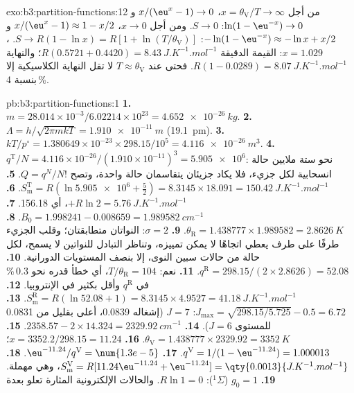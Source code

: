 \begin{solution}{exo:b3:partition-functions:12}
من أجل $x = \theta_{\mathrm V}/T \to \infty$، $x/(\eu^x - 1) \to 0$ و$\ln(1 - \eu^{-x}) \to 0$: $S \to 0$. ومن أجل $x \to 0$،
$x/(\eu^x - 1) \approx 1 - x/2$ و$-\ln(1 - \eu^{-x}) \approx -\ln x + x/2$: $S \to R(1 - \ln x) = R[1 + \ln(T/\theta_{\mathrm V})]$.
، $x = 1.029$: القيمة الدقيقة $R(0.5721 + 0.4420) = \qty{8.43}{J.K^{-1}.mol^{-1}}$؛ والنهاية $R(1 - 0.0289) =
\qty{8.07}{J.K^{-1}.mol^{-1}}$. فحتى عند $T \approx \theta_{\mathrm V}$ لا تقل النهاية الكلاسيكية إلا بنسبة 4\,\%.
\end{solution}

\begin{solution}{pb:b3:partition-functions:1}
\textbf{1.} $m = 28.014\times10^{-3}/6.02214\times10^{23} = \qty{4.652e-26}{kg}$.
\textbf{2.} $\Lambda = h/\sqrt{2\pi mkT} = \qty{1.910e-11}{m}$ (\qty{19.1}{pm}).
\textbf{3.} $kT/p^\circ = 1.380649\times10^{-23} \times 298.15/10^5 = \qty{4.116e-26}{m^3}$.
\textbf{4.} $q^{\mathrm T}/N = 4.116\times10^{-26}/(1.910\times10^{-11})^3 = \num{5.905e6}$: نحو ستة ملايين
حالة انسحابية لكل جزيء، فلا يكاد جزيئان يتقاسمان حالة واحدة، 
وتصح $Q = q^N/N!$.
\textbf{5.} $S^{\mathrm T}_{\mathrm m} = R(\ln\num{5.905e6} + \frac52) = 8.3145 \times 18.091 = \qty{150.42}{J.K^{-1}.mol^{-1}}$.
\textbf{6.} $+R\ln2 = \qty{5.76}{J.K^{-1}.mol^{-1}}$، أي \num{156.18}.
\textbf{7.} $B_0 = 1.998241 - 0.008659 = \qty{1.989582}{cm^{-1}}$.
\textbf{8.} $\theta_{\mathrm R} = 1.438777 \times 1.989582 = \qty{2.8626}{K}$.
\textbf{9.} $\sigma = 2$: النواتان متطابقتان؛ وقلب الجزيء طرفًا على طرف
يعطي اتجاهًا لا يمكن تمييزه، وتناظر التبادل للنواتين
لا يسمح، لكل حالة من حالات سبين النوى، إلا بنصف المستويات الدورانية.
\textbf{10.} $q^{\mathrm R} = 298.15/(2 \times 2.8626) = 52.08$.
\textbf{11.} نعم: $T/\theta_{\mathrm R} = 104$، أي خطأ قدره نحو 0.3\,\% في $q^{\mathrm R}$ وأقل بكثير في
الإنتروبيا.
\textbf{12.} $S^{\mathrm R}_{\mathrm m} = R(\ln52.08 + 1) = 8.3145 \times 4.9527 = \qty{41.18}{J.K^{-1}.mol^{-1}}$.
\textbf{13.} $J_{\max} = \sqrt{298.15/5.725} - 0.5 = 6.72$: $J = 7$ (إشغاله 0.0839، أعلى بقليل من
0.0831 للمستوى $J = 6$).
\textbf{14.} $2358.57 - 2 \times 14.324 = \qty{2329.92}{cm^{-1}}$.
\textbf{15.} $\theta_{\mathrm V} = 1.438777 \times 2329.92 = \qty{3352}{K}$.
\textbf{16.} $x = 3352.2/298.15 = 11.24$؛ $q^{\mathrm V} = 1/(1 - \eu^{-11.24}) = 1.000013$.
\textbf{17.} $\eu^{-11.24}/q^{\mathrm V} = \num{1.3e-5}$.
\textbf{18.} $S^{\mathrm V}_{\mathrm m} = R[11.24\eu^{-11.24} + \eu^{-11.24}] = \qty{0.0013}{J.K^{-1}.mol^{-1}}$، وهي مهملة.
\textbf{19.} $g_0 = 1$ (${}^1\Sigma$): $R\ln1 = 0$. والحالات الإلكترونية المثارة تعلو بعدة

\end{solution}

